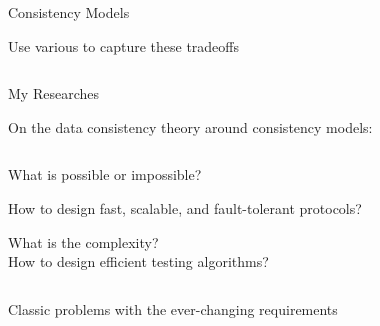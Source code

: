 \begin{frame}{Consistency Models}
	\begin{center}
		Use various  to capture these tradeoffs
	\end{center}

	\begin{columns}[c]
		\begin{center}
		\end{center}
		\begin{center}
		\end{center}
	\end{columns}

	\pause
\end{frame}

\begin{frame}{My Researches}
	\begin{center}
		On the data consistency theory around consistency models:
	\end{center}

	\pause
	\begin{columns}
		\begin{description}[<+->]
			\setlength{\itemsep}{8pt}
			\item[Computability:] What is possible or impossible?
			\item[Protocol:] How to design fast, scalable, and fault-tolerant protocols?
			\item[Testing:] What is the complexity? \\[3pt] How to design efficient testing algorithms?
		\end{description}
	\end{columns}

	\pause
	\vspace{0.50cm}
	\begin{center}
		Classic problems with the ever-changing requirements
	\end{center}
\end{frame}


